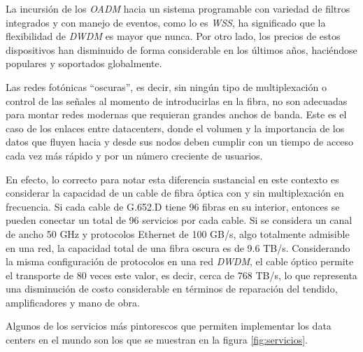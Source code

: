 La incursión de los \emph{OADM} hacia un sistema programable con
variedad de filtros integrados y con manejo de eventos, como lo es
\emph{WSS}, ha significado que la flexibilidad de \emph{DWDM} es mayor
que nunca. Por otro lado, los precios de estos dispositivos han
disminuido de forma considerable en los últimos años, haciéndose
populares y soportados globalmente.

Las redes fotónicas ``oscuras'', es decir, sin ningún tipo de
multiplexación o control de las señales al momento de introducirlas en
la fibra, no son adecuadas para montar redes modernas que requieran
grandes anchos de banda. Este es el caso de los enlaces entre 
datacenters, donde el volumen y la importancia de los datos que fluyen
hacia y desde sus nodos deben cumplir con un tiempo de acceso cada vez
más rápido y por un número creciente de usuarios.

En efecto, lo correcto para notar esta diferencia sustancial en este
contexto es considerar la capacidad de un cable de fibra óptica con y
sin multiplexación en frecuencia. Si cada cable de G.652.D tiene 96
fibras en su interior, entonces se pueden conectar un total de 96
servicios por cada cable. Si se considera un canal de ancho 50 GHz y
protocolos Ethernet de 100 GB/s, algo totalmente admisible en una red,
la capacidad total de una fibra oscura es de 9.6 TB/s. Considerando la
misma configuración de protocolos en una red \emph{DWDM}, el cable
óptico permite el transporte de 80 veces este valor, es decir, cerca
de 768 TB/s, lo que representa una disminución de costo considerable
en términos de reparación del tendido, amplificadores y mano de obra.

Algunos de los servicios más pintorescos que permiten implementar los
data centers en el mundo son los que se muestran en la figura
\ref{fig:servicios}.

